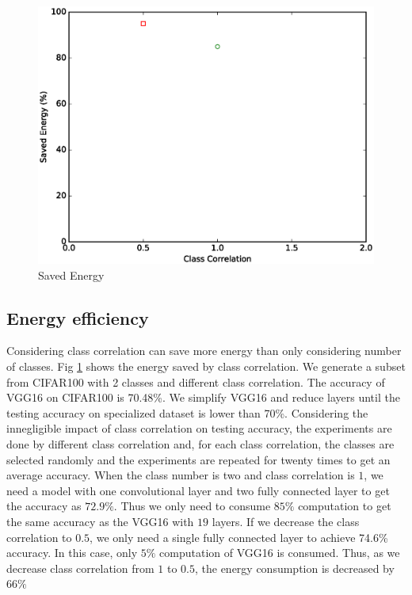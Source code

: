 \documentclass[conference]{IEEEtran}
\begin{document}
\begin{spacing}{0.9}
\begin{figure}
\includegraphics[scale=0.43]{savedEnergy.ps}
\caption{Saved Energy}
\label{fig:savedEnergy}
\end{figure}


\subsection{Energy efficiency}
Considering class correlation can save more energy than only considering number of classes. Fig \ref{fig:savedEnergy} shows the energy saved by class correlation. We generate a subset from CIFAR100 with 2 classes and different class correlation. The accuracy of VGG16 on CIFAR100 is 70.48\%. We simplify VGG16 and reduce layers until the testing accuracy on specialized dataset is lower than 70\%. Considering the innegligible impact of class correlation on testing accuracy, the experiments are done by different class correlation and, for each class correlation, the classes are selected randomly and the experiments are repeated for twenty times to get an average accuracy. When the class number is two and class correlation is $1$, we need a model with one convolutional layer and two fully connected layer to get the accuracy as $72.9\%$. Thus we only need to consume $85\%$ computation to get the same accuracy as the VGG16 with $19$ layers. If we decrease the class correlation to $0.5$, we only need a single fully connected layer to achieve 74.6\% accuracy. In this case, only $5\%$ computation of VGG16 is consumed. Thus, as we decrease class correlation from $1$ to $0.5$, the energy consumption is decreased by $66\%$



\end{spacing}
\end{document}
